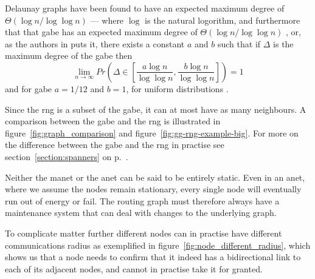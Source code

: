 Delaunay graphs have been found to have an expected maximum degree of $\Theta(\log n / \log \log n)$ \cite{delExpected} --- where $\log$ is the natural logorithm, and furthermore that that \ac{gabe} has an expected maximum degree of $\Theta(\log n / \log \log n)$ \cite{GGExpected}, or, as the authors in \cite{GGExpected} puts it, there exists a constant $a$ and $b$ such that if $\Delta$ is the maximum degree of the \ac{gabe} then 
$$
\lim_{n \rightarrow \infty} Pr\left({\Delta \in \left[\frac{a\log n}{\log \log n}, \frac{b\log n}{\log \log n}\right]}\right) = 1
$$
and for \ac{gabe} $a = 1/12$ and $b = 1$, for uniform distributions \cite{GGExpected}.

Since the \ac{rng} is a subset of the \ac{gabe}, it can at most have as many neighbours. A comparison between the \ac{gabe} and the \ac{rng} is illustrated in figure~\ref{fig:graph_comparison} and figure~\ref{fig:gg-rng-example-big}. For more on the difference between the \ac{gabe} and the \ac{rng} in practise see section~\ref{section:spanners} on p.~\pageref{section:spanners}.


Neither the \ac{manet} or the \ac{anet} can be said to be entirely static. Even in an \ac{anet}, where we assume the nodes remain stationary, every single node will eventually run out of energy or fail. The routing graph must therefore always have a maintenance system that can deal with changes to the underlying graph. 

To complicate matter further different nodes can in practise have different communications radius as exemplified in figure~\ref{fig:node_different_radius}, which shows us that a node needs to confirm that it indeed has a bidirectional link to each of its adjacent nodes, and cannot in practise take it for granted.


